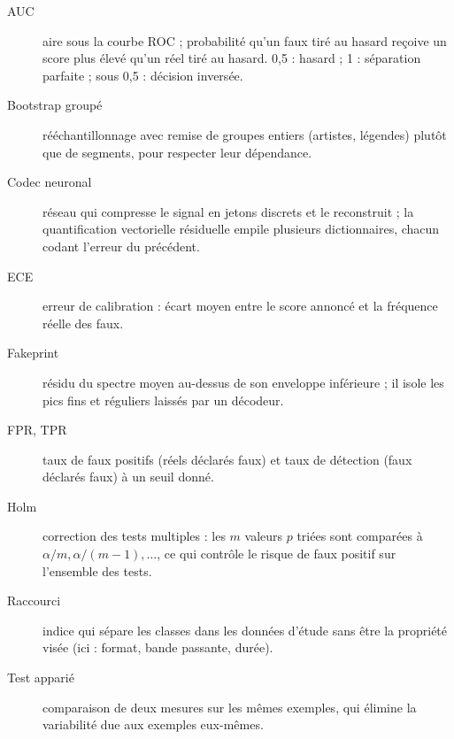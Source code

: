 \documentclass[a4paper, 11pt]{article}
\begin{document}
\begin{description}
    \item[AUC] aire sous la courbe ROC ; probabilité qu'un faux tiré au hasard reçoive un score plus élevé
    qu'un réel tiré au hasard. 0,5 : hasard ; 1 : séparation parfaite ; sous 0,5 : décision inversée.
    \item[Bootstrap groupé] rééchantillonnage avec remise de groupes entiers (artistes, légendes) plutôt que
    de segments, pour respecter leur dépendance.
    \item[Codec neuronal] réseau qui compresse le signal en jetons discrets et le reconstruit ; la
    quantification vectorielle résiduelle empile plusieurs dictionnaires, chacun codant l'erreur du précédent.
    \item[ECE] erreur de calibration : écart moyen entre le score annoncé et la fréquence réelle des faux.
    \item[Fakeprint] résidu du spectre moyen au-dessus de son enveloppe inférieure ; il isole les pics fins
    et réguliers laissés par un décodeur.
    \item[FPR, TPR] taux de faux positifs (réels déclarés faux) et taux de détection (faux déclarés faux) à
    un seuil donné.
    \item[Holm] correction des tests multiples : les $m$ valeurs $p$ triées sont comparées à
    $\alpha/m, \alpha/(m-1), \dots$, ce qui contrôle le risque de faux positif sur l'ensemble des tests.
    \item[Raccourci] indice qui sépare les classes dans les données d'étude sans être la propriété visée
    (ici : format, bande passante, durée).
    \item[Test apparié] comparaison de deux mesures sur les mêmes exemples, qui élimine la variabilité due
    aux exemples eux-mêmes.
\end{description}
\end{document}
